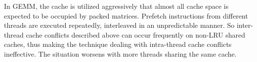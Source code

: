 In GEMM, the cache is utilized aggressively
that almost all cache space is expected to be occupied by packed matrices.
Prefetch instructions from different threads are executed repeatedly,
interleaved in an unpredictable manner.
So inter-thread cache conflicts described above
can occur frequently on non-LRU shared caches,
thus making the technique dealing with intra-thread cache conflicts ineffective.
The situation worsens with more threads sharing the same cache.

